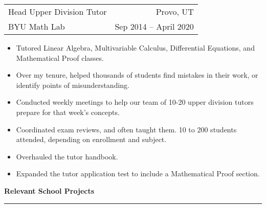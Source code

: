 \documentclass{article}
\newenvironment{compactItemize}{
  \begin{itemize}[itemsep=0ex, parsep=0ex, partopsep=0ex, topsep= -7pt]
}{
  \end{itemize}
}
\newcommand{\jobInfo}[4]{
  \begingroup
  \setlength{\tabcolsep}{0ex}
  \begin{tabularx}{\linewidth}{X r}
    #1 & %
    #2\\ %
    #3 & %
    #4   %
  \end{tabularx}%
  \endgroup%
}
\begin{document}
\jobInfo{Head Upper Division Tutor}{Provo, UT}{BYU Math Lab}{Sep 2014 -- April 2020}
\begin{compactItemize}
  \item Tutored Linear Algebra, Multivariable Calculus, Differential Equations, and Mathematical Proof classes.
  \item Over my tenure, helped thousands of students find mistakes in their work, or identify points of misunderstanding.
  \item Conducted weekly meetings to help our team of 10-20 upper division tutors prepare for that week's concepts.
  \item Coordinated exam reviews, and often taught them.  10 to 200 students attended, depending on enrollment and subject.
  \item Overhauled the tutor handbook.
  \item Expanded the tutor application test to include a Mathematical Proof section.
\end{compactItemize}
\medskip
\textbf{Relevant School Projects %
}
\smallskip
\hrule
\end{document}
